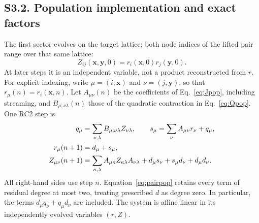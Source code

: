 \documentclass[10pt,letterpaper]{article}
\begin{document}
\newpage
\subsection*{S3.2. Population implementation and exact factors}

The first sector evolves on the target lattice; both node indices of the lifted pair range over that same lattice:
\begin{equation}
 Z_{ij}(\bm x,\bm y,0)=r_i(\bm x,0)r_j(\bm y,0).
\end{equation}
At later steps it is an independent variable, not a product reconstructed from $r$. For explicit indexing, write $\mu=(i,\bm x)$ and $\nu=(j,\bm y)$, so that $r_\mu(n)=r_i(\bm x,n)$. Let $A_{\mu\nu}(n)$ be the coefficients of Eq.~\eqref{eq:Jpop}, including streaming, and $B_{\mu;\nu\lambda}(n)$ those of the quadratic contraction in Eq.~\eqref{eq:Qpop}. One RC2 step is
\begin{align}
 q_\mu&=\sum_{\nu,\lambda}B_{\mu;\nu\lambda}Z_{\nu\lambda},\qquad
 s_\mu=\sum_\nu A_{\mu\nu}r_\nu+q_\mu,\notag\\
 r_\mu(n+1)&=d_\mu+s_\mu,\label{eq:liftpop}\\
 Z_{\mu\nu}(n+1)&=\sum_{\kappa,\lambda}A_{\mu\kappa}Z_{\kappa\lambda}A_{\nu\lambda}
 +d_\mu s_\nu+s_\mu d_\nu+d_\mu d_\nu.
 \label{eq:pairpop}
\end{align}
All right-hand sides use step $n$. Equation~\eqref{eq:pairpop} retains every term of residual degree at most two, treating prescribed $d$ as degree zero. In particular, the terms $d_\mu q_\nu+q_\mu d_\nu$ are included. The system is affine linear in its independently evolved variables $(r,Z)$.
\end{document}
